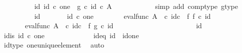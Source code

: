 \begin{isabellebody}
\ \ \ \ \ \ \ \ \isamarkupfalse%
\ {\isachardoublequoteopen}{\isasymAnd}id{\isacharunderscore}{\kern0pt}{}{\isachardot}{\kern0pt}\ id{\isacharunderscore}{\kern0pt}{}\ {\isasymin}\isactrlsub c\ one\ {\isasymLongrightarrow}\ g\ {\isasymcirc}\isactrlsub c\ id{\isacharunderscore}{\kern0pt}{}\ {\isasymin}\isactrlsub c\ A\isactrlbsup {\isasymOmega}\isactrlesup {\isachardoublequoteclose}\isanewline
\ \ \ \ \ \ \ \ \ \ \isamarkupfalse%
\ {\isacharparenleft}{\kern0pt}simp\ add{\isacharcolon}{\kern0pt}\ comp{\isacharunderscore}{\kern0pt}type\ g{\isacharunderscore}{\kern0pt}type{\isacharparenright}{\kern0pt}\isanewline
\ \ \ \ \ \ \ \ \isamarkupfalse%
\ {\isachardoublequoteopen}{\isasymAnd}id{\isacharunderscore}{\kern0pt}{}{\isachardot}{\kern0pt}\isanewline
\ \ \ \ \ \ \ id{\isacharunderscore}{\kern0pt}{}\ {\isasymin}\isactrlsub c\ one\ {\isasymLongrightarrow}\isanewline
\ \ \ \ \ \ \ eval{\isacharunderscore}{\kern0pt}func\ A\ {\isasymOmega}\ {\isasymcirc}\isactrlsub c\ id\isactrlsub c\ {\isasymOmega}\ {\isasymtimes}\isactrlsub f\ f\ {\isasymcirc}\isactrlsub c\ id{\isacharunderscore}{\kern0pt}{}\ {\isacharequal}{\kern0pt}\isanewline
\ \ \ \ \ \ \ eval{\isacharunderscore}{\kern0pt}func\ A\ {\isasymOmega}\ {\isasymcirc}\isactrlsub c\ id\isactrlsub c\ {\isasymOmega}\ {\isasymtimes}\isactrlsub f\ g\ {\isasymcirc}\isactrlsub c\ id{\isacharunderscore}{\kern0pt}{}{\isachardoublequoteclose}\isanewline
\ \ \ \ \ \ \ \ \isamarkupfalse%
\ \ {\isacharminus}{\kern0pt}\isanewline
\ \ \ \ \ \ \ \ \ \ \isamarkupfalse%
\ id{\isacharunderscore}{\kern0pt}{}\isanewline
\ \ \ \ \ \ \ \ \ \ \isamarkupfalse%
\ id{}{\isacharunderscore}{\kern0pt}is{\isacharcolon}{\kern0pt}\ {\isachardoublequoteopen}id{\isacharunderscore}{\kern0pt}{}\ {\isasymin}\isactrlsub c\ one{\isachardoublequoteclose}\isanewline
\ \ \ \ \ \ \ \ \ \ \isamarkupfalse%
\ \isamarkupfalse%
\ id{}{\isacharunderscore}{\kern0pt}eq{\isacharcolon}{\kern0pt}\ {\isachardoublequoteopen}id{\isacharunderscore}{\kern0pt}{}\ {\isacharequal}{\kern0pt}\ id{\isacharparenleft}{\kern0pt}one{\isacharparenright}{\kern0pt}{\isachardoublequoteclose}\isanewline
\ \ \ \ \ \ \ \ \ \ \ \ \isamarkupfalse%
\ id{\isacharunderscore}{\kern0pt}type\ one{\isacharunderscore}{\kern0pt}unique{\isacharunderscore}{\kern0pt}element\ \isamarkupfalse%
\ auto\isanewline

\end{isabellebody}
